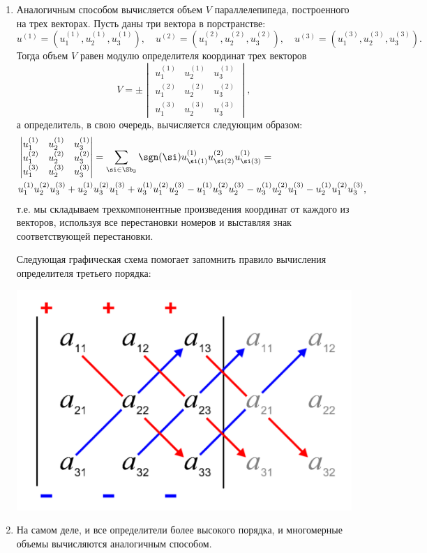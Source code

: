 \begin{enumerate}
\item Аналогичным способом вычисляется объем $V$ параллелепипеда, построенного на трех векторах. Пусть даны три вектора в порстранстве:
$$
u^{(1)}=(u^{(1)}_1,u^{(1)}_2,u^{(1)}_3),\quad u^{(2)}=(u^{(2)}_1,u^{(2)}_2,u^{(2)}_3),\quad u^{(3)}=(u^{(3)}_1,u^{(3)}_2,u^{(3)}_3).
$$
Тогда объем $V$ равен модулю определителя координат трех векторов
$$
V=\pm\begin{vmatrix}
u^{(1)}_1 & u^{(1)}_2 & u^{(1)}_3 \\
u^{(2)}_1 & u^{(2)}_2 & u^{(2)}_3 \\
u^{(3)}_1 & u^{(3)}_2 & u^{(3)}_3 
\end{vmatrix},
$$
а определитель, в свою очередь, вычисляется следующим образом:
\begin{align*}
&
\begin{vmatrix}
u^{(1)}_1 & u^{(1)}_2 & u^{(1)}_3 \\
u^{(2)}_1 & u^{(2)}_2 & u^{(2)}_3 \\
u^{(3)}_1 & u^{(3)}_2 & u^{(3)}_3 
\end{vmatrix} = \sum_{\si\in\Sb_3} \sgn(\si) u^{(1)}_{\si(1)} u^{(2)}_{\si(2)} u^{(1)}_{\si(3)}= \\
& u^{(1)}_1 u^{(2)}_2 u^{(3)}_3 + u^{(1)}_2 u^{(2)}_3 u^{(3)}_1 +
u^{(1)}_3 u^{(2)}_1  u^{(3)}_2 - u^{(1)}_1 u^{(2)}_3  u^{(3)}_2 
 -u^{(1)}_3 u^{(2)}_2  u^{(3)}_1 -u^{(1)}_2 u^{(2)}_1 u^{(3)}_3,
\end{align*}
т.е. мы складываем трехкомпонентные произведения координат от каждого из векторов, используя все перестановки номеров и выставляя знак соответствующей перестановки.

Следующая графическая схема помогает запомнить правило вычисления определителя третьего порядка:
\begin{center}
\includegraphics[scale=0.15]{Det.png}
\end{center}

\item На самом деле, и все определители более высокого порядка, и многомерные объемы вычисляются аналогичным способом.

\end{enumerate}










